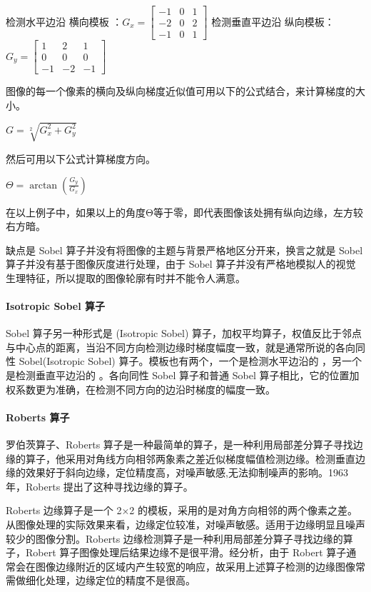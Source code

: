 \documentclass[
]{article}
\begin{document}
检测水平边沿 横向模板
：\(G_{x}=\begin{bmatrix} -1 & 0 & 1\\ -2 & 0 & 2\\ -1 & 0 & 1 \end{bmatrix}\)
检测垂直平边沿
纵向模板：\(G_{y}=\begin{bmatrix} 1 & 2 & 1\\ 0 & 0 & 0\\ -1 & -2 & -1 \end{bmatrix}\)

图像的每一个像素的横向及纵向梯度近似值可用以下的公式结合，来计算梯度的大小。

\(G=\sqrt[2]{G_{x}^{2}+G_{y}^{2}}\)

然后可用以下公式计算梯度方向。

\(\Theta =\arctan (\frac{G_{y}}{G_{x}})\)

在以上例子中，如果以上的角度Θ等于零，即代表图像该处拥有纵向边缘，左方较右方暗。

缺点是 Sobel 算子并没有将图像的主题与背景严格地区分开来，换言之就是
Sobel 算子并没有基于图像灰度进行处理，由于 Sobel
算子并没有严格地模拟人的视觉生理特征，所以提取的图像轮廓有时并不能令人满意。

\hypertarget{header-n58}{%
\paragraph{Isotropic Sobel 算子}\label{header-n58}}

Sobel 算子另一种形式是 (Isotropic Sobel)
算子，加权平均算子，权值反比于邻点与中心点的距离，当沿不同方向检测边缘时梯度幅度一致，就是通常所说的各向同性
Sobel(Isotropic Sobel) 算子。模板也有两个，一个是检测水平边沿的
，另一个是检测垂直平边沿的 。各向同性 Sobel 算子和普通 Sobel
算子相比，它的位置加权系数更为准确，在检测不同方向的边沿时梯度的幅度一致。

\hypertarget{header-n60}{%
\paragraph{Roberts 算子}\label{header-n60}}

罗伯茨算子、Roberts
算子是一种最简单的算子，是一种利用局部差分算子寻找边缘的算子，他采用对角线方向相邻两象素之差近似梯度幅值检测边缘。检测垂直边缘的效果好于斜向边缘，定位精度高，对噪声敏感,无法抑制噪声的影响。1963年，Roberts
提出了这种寻找边缘的算子。

Roberts 边缘算子是一个 2×2
的模板，采用的是对角方向相邻的两个像素之差。从图像处理的实际效果来看，边缘定位较准，对噪声敏感。适用于边缘明显且噪声较少的图像分割。Roberts
边缘检测算子是一种利用局部差分算子寻找边缘的算子，Robert
算子图像处理后结果边缘不是很平滑。经分析，由于 Robert
算子通常会在图像边缘附近的区域内产生较宽的响应，故采用上述算子检测的边缘图像常需做细化处理，边缘定位的精度不是很高。
\end{document}
